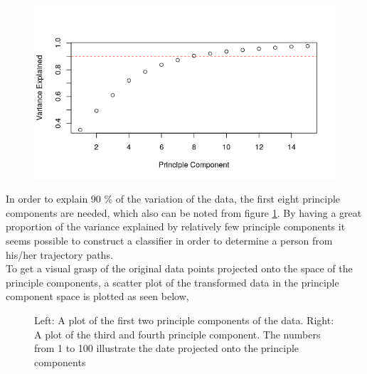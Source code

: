\documentclass[11pt, fleqn, titlepage]{article}
\begin{document}
\begin{figure}[H]
	\centering
	\includegraphics[width=0.7\linewidth]{billeder/varexp.png}
	\caption{}
	\label{fig:varexp}
\end{figure}

In order to explain 90 \% of the variation of the data, the first eight principle components are needed, which also can be noted from figure \ref{fig:varexp}. By having a great proportion of the variance explained by relatively few principle components it seems possible to construct a classifier in order to determine a person from his/her trajectory paths.
\\
To get a visual grasp of the original data points projected onto the space of the principle components, a scatter plot of the transformed data in the principle component space is plotted as seen below,

\begin{figure}[H]
	\centering
	\qquad
	\caption{Left: A plot of the first two principle components of the data. Right: A plot of the third and fourth principle component. The numbers from 1 to 100 illustrate the date projected onto the principle components}%
	\label{fig:example}%
\end{figure}
\end{document}
